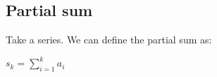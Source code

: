 
\subsection{Partial sum}

Take a series. We can define the partial sum as:

\(s_k=\sum_{i=1}^ka_i\)

